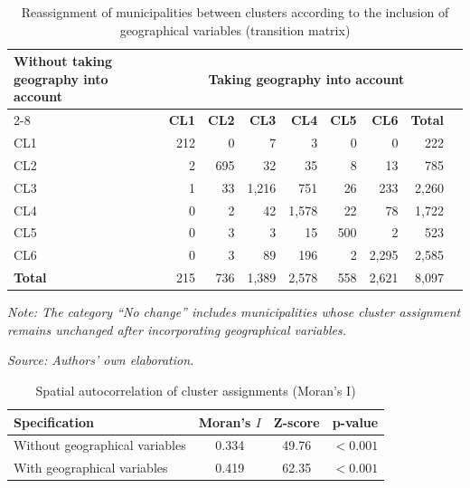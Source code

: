 \documentclass[a4paper,11pt,oneside]{article}
\begin{document}
\clearpage
\pagebreak

\begin{table}[H]
\centering
\scriptsize
\caption{Reassignment of municipalities between clusters according to the inclusion of geographical variables (transition matrix)}
\label{tab:reassign_clusters}
\setlength{\tabcolsep}{5pt}
\renewcommand{\arraystretch}{1.1}
\begin{tabular}{l *{7}{r} r}
\toprule
\textbf{Without taking geography into account}
& \multicolumn{7}{c}{\textbf{Taking geography into account}}  \\
\cmidrule(lr){2-8}
 & \textbf{CL1} & \textbf{CL2} & \textbf{CL3} & \textbf{CL4} & \textbf{CL5} & \textbf{CL6} & \textbf{Total} \\
\midrule
CL1 & 212 & 0 & 7 & 3 & 0 & 0 & 222 \\
CL2 & 2 &695 & 32 & 35 & 8 & 13 & 785 \\
CL3 & 1 & 33 & 1,216 & 751 & 26 & 233 &  2,260 \\
CL4 & 0 & 2 & 42 & 1,578 & 22 & 78 &  1,722 \\
CL5 & 0 & 3 & 3 & 15 & 500 & 2 &  523 \\
CL6 & 0 & 3 & 89 & 196 & 2 & 2,295 &  2,585 \\
\midrule
\textbf{Total}
& 215 & 736 & 1,389 & 2,578 & 558 & 2,621 &  8,097 \\
\bottomrule
\end{tabular}

\vspace{2mm}
\footnotesize\emph{Note: The category ``No change'' includes municipalities whose cluster assignment remains unchanged after incorporating geographical variables.}

\footnotesize\emph{Source: Authors' own elaboration.}
\end{table}



\clearpage
\pagebreak

\begin{table}[ht]
\centering
\caption{Spatial autocorrelation of cluster assignments (Moran's I)}
\label{tab:moran}
\begin{tabular}{lccc}
\hline
Specification & Moran's $I$ & Z-score & p-value \\
\hline
Without geographical variables & 0.334 & 49.76 & $<0.001$ \\
With geographical variables & 0.419 & 62.35 & $<0.001$ \\
\hline
\end{tabular}

\end{table}
\end{document}
